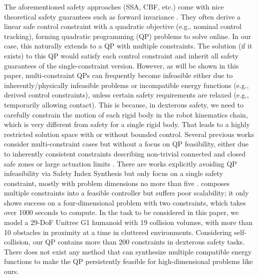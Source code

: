 The aforementioned safety approaches (SSA, CBF, etc.) come with nice theoretical safety guarantees such as forward invariance \cite{liu2014control, chen2023sis, ames2016control}.
They often derive a linear safe control constraint with a quadratic objective (e.g., nominal control tracking), forming quadratic programming (QP) problems to solve online.
In our case, this naturally extends to a QP with multiple constraints.
The solution (if it exists) to this QP would satisfy each control constraint and inherit all safety guarantees of the single-constraint version.
However, as will be shown in this paper, multi-constraint QPs can frequently become infeasible either due to inherently/physically infeasible problems or incompatible energy functions (e.g., derived control constraints), unless certain safety requirements are relaxed (e.g., temporarily allowing contact).
This is because, in dexterous safety, we need to carefully constrain the motion of each rigid body in the robot kinematics chain, which is very different from safety for a single rigid body.
That leads to a highly restricted solution space with or without bounded control.
Several previous works consider multi-constraint cases but without a focus on QP feasibility, either due to inherently consistent constraints describing non-trivial connected and closed safe zones \cite{djeha2023robust, nguyen20163d} or large actuation limits \cite{khazoom2022humanoid}.
There are works explicitly avoiding QP infeasibility via Safety Index Synthesis but only focus on a single safety constraint, mostly with problem dimensions no more than five \cite{zhao2023sos, chen2023sis, chen2023sia, liu2022inputsat}.
\cite{breeden2023compositions} composes multiple constraints into a feasible controller but suffers poor scalability; it only shows success on a four-dimensional problem with two constraints, which takes over 1000 seconds to compute.
In the task to be considered in this paper, we model a 29-DoF Unitree G1 humanoid with 19 collision volumes, with more than 10 obstacles in proximity at a time in cluttered environments.
Considering self-collision, our QP contains more than 200 constraints in dexterous safety tasks.
There does not exist any method that can synthesize multiple compatible energy functions to make the QP persistently feasible for high-dimensional problems like ours.

